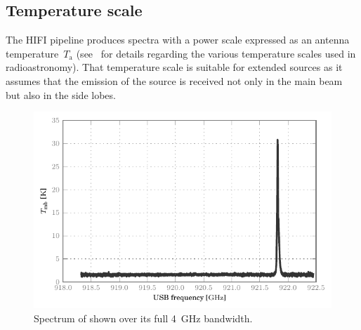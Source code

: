 
\subsection{Temperature scale}
The HIFI pipeline produces spectra with a power scale expressed as an antenna temperature~$T_\text{a}$
(see~\textcite{kutner1981recommendations} for details regarding the various temperature scales used in radioastronomy).
That temperature scale is suitable for extended sources as it assumes that the emission of the source is received not only in the main beam but also in the side lobes.

\begin{figure}
    \centering
    \includegraphics{87_00_00_tmb}
    \caption{
        Spectrum of  shown over its full \SI{4}{\giga\hertz} bandwidth.
    }
    \label{fig:co98_full_bandwidth}
\end{figure}


